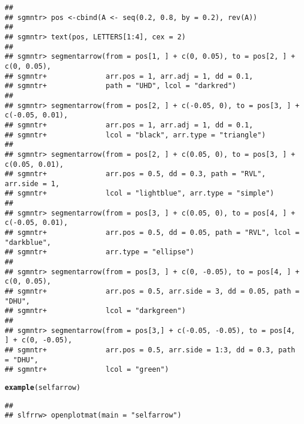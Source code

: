 \documentclass{article}\usepackage{graphicx, color}
\makeatletter
\newcommand{\hlfunctioncall}[1]{\textcolor[rgb]{0.501960784313725,0,0.329411764705882}{\textbf{#1}}}%
\newenvironment{kframe}{%
 \def\at@end@of@kframe{}%
 \ifinner\ifhmode%
  \def\at@end@of@kframe{\end{minipage}}%
  \begin{minipage}{\columnwidth}%
 \fi\fi%
 \def\FrameCommand##1{\hskip\@totalleftmargin \hskip-\fboxsep
 \colorbox{shadecolor}{##1}\hskip-\fboxsep
     \hskip-\linewidth \hskip-\@totalleftmargin \hskip\columnwidth}%
 \MakeFramed {\advance\hsize-\width
   \@totalleftmargin\z@ \linewidth\hsize
   \@setminipage}}%
 {\par\unskip\endMakeFramed%
 \at@end@of@kframe}
\newenvironment{knitrout}{}{} %
\makeatother
\begin{document}
\begin{knitrout}
\begin{kframe}
\begin{verbatim}
## 
## sgmntr> pos <-cbind(A <- seq(0.2, 0.8, by = 0.2), rev(A))
## 
## sgmntr> text(pos, LETTERS[1:4], cex = 2)
## 
## sgmntr> segmentarrow(from = pos[1, ] + c(0, 0.05), to = pos[2, ] + c(0, 0.05),
## sgmntr+              arr.pos = 1, arr.adj = 1, dd = 0.1, 
## sgmntr+              path = "UHD", lcol = "darkred")
## 
## sgmntr> segmentarrow(from = pos[2, ] + c(-0.05, 0), to = pos[3, ] + c(-0.05, 0.01),
## sgmntr+              arr.pos = 1, arr.adj = 1, dd = 0.1,
## sgmntr+              lcol = "black", arr.type = "triangle")
## 
## sgmntr> segmentarrow(from = pos[2, ] + c(0.05, 0), to = pos[3, ] + c(0.05, 0.01),
## sgmntr+              arr.pos = 0.5, dd = 0.3, path = "RVL", arr.side = 1,
## sgmntr+              lcol = "lightblue", arr.type = "simple")  
## 
## sgmntr> segmentarrow(from = pos[3, ] + c(0.05, 0), to = pos[4, ] + c(-0.05, 0.01),
## sgmntr+              arr.pos = 0.5, dd = 0.05, path = "RVL", lcol = "darkblue",
## sgmntr+              arr.type = "ellipse")  
## 
## sgmntr> segmentarrow(from = pos[3, ] + c(0, -0.05), to = pos[4, ] + c(0, 0.05),
## sgmntr+              arr.pos = 0.5, arr.side = 3, dd = 0.05, path = "DHU",
## sgmntr+              lcol = "darkgreen")  
## 
## sgmntr> segmentarrow(from = pos[3,] + c(-0.05, -0.05), to = pos[4, ] + c(0, -0.05),
## sgmntr+              arr.pos = 0.5, arr.side = 1:3, dd = 0.3, path = "DHU",
## sgmntr+              lcol = "green")
\end{verbatim}
\begin{alltt}
\hlfunctioncall{example}(selfarrow)
\end{alltt}
\begin{verbatim}
## 
## slfrrw> openplotmat(main = "selfarrow")


\end{verbatim}
\end{kframe}
\end{knitrout}
\end{document}
